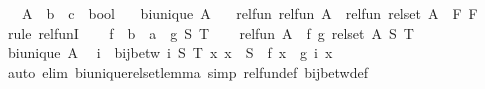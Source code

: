 \begin{isabellebody}
\ \ \ A\ {\isacharcolon}{\kern0pt}{\isacharcolon}{\kern0pt}\ {\isachardoublequoteopen}{\isacharprime}{\kern0pt}b\ {\isasymRightarrow}\ {\isacharprime}{\kern0pt}c\ {\isasymRightarrow}\ bool{\isachardoublequoteclose}\isanewline
\ \ \ {\isachardoublequoteopen}bi{\isacharunderscore}{\kern0pt}unique\ A{\isachardoublequoteclose}\isanewline
\ \ \ {\isachardoublequoteopen}rel{\isacharunderscore}{\kern0pt}fun\ {\isacharparenleft}{\kern0pt}rel{\isacharunderscore}{\kern0pt}fun\ A\ {\isacharparenleft}{\kern0pt}{\isacharequal}{\kern0pt}{\isacharparenright}{\kern0pt}{\isacharparenright}{\kern0pt}\ {\isacharparenleft}{\kern0pt}rel{\isacharunderscore}{\kern0pt}fun\ {\isacharparenleft}{\kern0pt}rel{\isacharunderscore}{\kern0pt}set\ A{\isacharparenright}{\kern0pt}\ {\isacharparenleft}{\kern0pt}{\isacharequal}{\kern0pt}{\isacharparenright}{\kern0pt}{\isacharparenright}{\kern0pt}\ F\ F{\isachardoublequoteclose}\isanewline
%
\isadelimproof
%
\endisadelimproof
%
\isatagproof
{}\isamarkupfalse%
\ {\isacharparenleft}{\kern0pt}rule\ rel{\isacharunderscore}{\kern0pt}funI{\isacharparenright}{\kern0pt}{\isacharplus}{\kern0pt}\isanewline
\ \ \isamarkupfalse%
\ f\ {\isacharcolon}{\kern0pt}{\isacharcolon}{\kern0pt}\ {\isachardoublequoteopen}{\isacharprime}{\kern0pt}b\ {\isasymRightarrow}\ {\isacharprime}{\kern0pt}a{\isachardoublequoteclose}\ \ g\ S\ T\isanewline
\ \ \isamarkupfalse%
\ {\isachardoublequoteopen}rel{\isacharunderscore}{\kern0pt}fun\ A\ {\isacharparenleft}{\kern0pt}{\isacharequal}{\kern0pt}{\isacharparenright}{\kern0pt}\ f\ g{\isachardoublequoteclose}\ {\isachardoublequoteopen}rel{\isacharunderscore}{\kern0pt}set\ A\ S\ T{\isachardoublequoteclose}\isanewline
\ \ \isamarkupfalse%
\ {\isacartoucheopen}bi{\isacharunderscore}{\kern0pt}unique\ A{\isacartoucheclose}\ \isamarkupfalse%
\ i\ \ {\isachardoublequoteopen}bij{\isacharunderscore}{\kern0pt}betw\ i\ S\ T{\isachardoublequoteclose}\ {\isachardoublequoteopen}{\isasymAnd}x{\isachardot}{\kern0pt}\ x\ {\isasymin}\ S\ {\isasymLongrightarrow}\ f\ x\ {\isacharequal}{\kern0pt}\ g\ {\isacharparenleft}{\kern0pt}i\ x{\isacharparenright}{\kern0pt}{\isachardoublequoteclose}\isanewline
\ \ \ \ \isamarkupfalse%
\ {\isacharparenleft}{\kern0pt}auto\ elim{\isacharcolon}{\kern0pt}\ bi{\isacharunderscore}{\kern0pt}unique{\isacharunderscore}{\kern0pt}rel{\isacharunderscore}{\kern0pt}set{\isacharunderscore}{\kern0pt}lemma\ simp{\isacharcolon}{\kern0pt}\ rel{\isacharunderscore}{\kern0pt}fun{\isacharunderscore}{\kern0pt}def\ bij{\isacharunderscore}{\kern0pt}betw{\isacharunderscore}{\kern0pt}def{\isacharparenright}{\kern0pt}\isanewline

\end{isabellebody}
